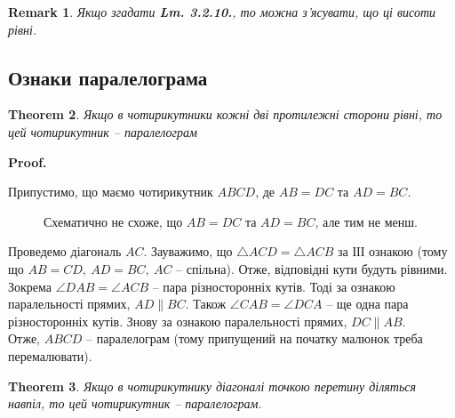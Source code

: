 \documentclass[a4paper, 10pt]{article}
\makeatletter
\def\qed{$\blacksquare$}
\theoremstyle{theoremdd}
\newtheorem{theorem}{Theorem}[subsection]
\theoremstyle{theoremdd}
\theoremstyle{theoremdd}
\theoremstyle{theoremdd}
\theoremstyle{theoremdd}
\theoremstyle{theoremdd}
\theoremstyle{theoremdd}
\newtheorem{remark}[theorem]{Remark}
\theoremstyle{theoremdd}
\theoremstyle{theoremdd}
\renewenvironment{proof}[1][Proof.\\]{\par
\pushQED{\hfill \qed}%
\normalfont \topsep6\p@\@plus6\p@\relax
\trivlist
\item\relax
{\bfseries
#1\@addpunct{.}}\hspace\labelsep\ignorespaces
}{%
\popQED\endtrivlist\@endpefalse
}
\makeatother
\begin{document}
\begin{remark}
Якщо згадати \textbf{Lm. 3.2.10.}, то можна з'ясувати, що ці висоти рівні.
\end{remark}

\subsection{Ознаки паралелограма}
\begin{theorem}
Якщо в чотирикутники кожні дві протилежні сторони рівні, то цей чотирикутник -- паралелограм
\end{theorem}

\begin{proof}
Припустимо, що маємо чотирикутник $ABCD$, де $AB = DC$ та $AD = BC$.
\begin{figure}[H]
\centering
{}
\caption*{Схематично не схоже, що $AB = DC$ та $AD = BC$, але тим не менш.}
\end{figure}
Проведемо діагональ $AC$. Зауважимо, що $\triangle ACD = \triangle ACB$ за ІІІ ознакою (тому що $AB = CD,\ AD = BC,\ AC$ -- спільна). Отже, відповідні кути будуть рівними. Зокрема $\angle DAB = \angle ACB$ -- пара різносторонніх кутів. Тоді за ознакою паралельності прямих, $AD \parallel BC$. Також $\angle CAB = \angle DCA$ -- ще одна пара різносторонніх кутів. Знову за ознакою паралельності прямих, $DC \parallel AB$.\\
Отже, $ABCD$ -- паралелограм (тому припущений на початку малюнок треба перемалювати).
\end{proof}

\begin{theorem}
Якщо в чотирикутнику діагоналі точкою перетину діляться навпіл, то цей чотирикутник -- паралелограм.
\end{theorem}
\end{document}
